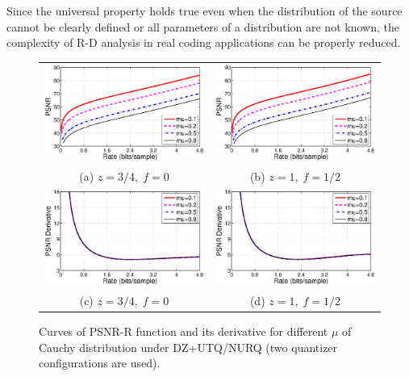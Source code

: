 \documentclass[smallabstract,smallcaptions]{dccpaper}
\begin{document}
Since the universal property holds true even when the distribution of the source cannot be clearly defined or all parameters of a distribution are not known, the complexity of R-D analysis in real coding applications can be properly reduced.

\begin{figure}
\begin{center}
\begin{tabular}{cc}
\includegraphics[width = 0.5\linewidth]{Figures/section3/RD_Cauchy_z=0_75_p=0} &
\includegraphics[width = 0.5\linewidth]{Figures/section3/RD_Cauchy_z=1_p=0_5} \\
{\small (a) $z=3/4,\;f=0$} & {\small (b) $z=1,\;f=1/2$} \\
\includegraphics[width = 0.5\linewidth]{Figures/section3/RDDerivative_Cauchy_z=0_75_p=0} &
\includegraphics[width = 0.5\linewidth]{Figures/section3/RDDerivative_Cauchy_z=1_p=0_5} \\
{\small (c) $z=3/4,\;f=0$} & {\small (d) $z=1,\;f=1/2$}
\end{tabular}
\end{center}
\vspace{-20pt}
\caption{\label{fig:RD_mu}
Curves of PSNR-R function and its derivative for different $\mu$ of Cauchy distribution under DZ+UTQ/NURQ (two quantizer configurations are used).}
\end{figure}
\end{document}
